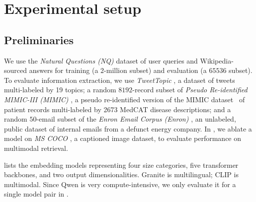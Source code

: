 \section{Experimental setup}
\label{sec:setup}

\subsection{Preliminaries}
\label{sec:prelims}

We use the \textit{Natural Questions (NQ)} \cite{kwiatkowski-etal-2019-natural} dataset of user queries and Wikipedia-sourced answers for training (a $2$-million subset) and evaluation (a $65536$ subset).  To evaluate information extraction, we use
\textit{TweetTopic} \cite{antypas-etal-2024-multilingual}, a dataset of tweets multi-labeled by 19 topics; a random $8192$-record subset of
\textit{Pseudo Re-identified MIMIC-III (MIMIC)} \cite{lehman-etal-2021-bert}, a pseudo re-identified version of the MIMIC dataset~\cite{johnson2016mimic} of patient records multi-labeled by 2673 MedCAT \cite{kraljevic2021multi} disease descriptions; and a random $50$-email subset of
the \textit{Enron Email Corpus (Enron)} \cite{10.1007/978-3-540-30115-8_22}, an unlabeled, public dataset of
internal emails from a defunct energy company.  In , we ablate a model on \textit{MS COCO} \cite{lin2014microsoft}, a captioned image dataset, to evaluate performance on multimodal retrieval.

  lists the embedding models representing four size categories, five transformer backbones, and two output dimensionalities.  Granite is multilingual; CLIP is multimodal. Since Qwen is very compute-intensive, we only evaluate it for a single model pair in .


